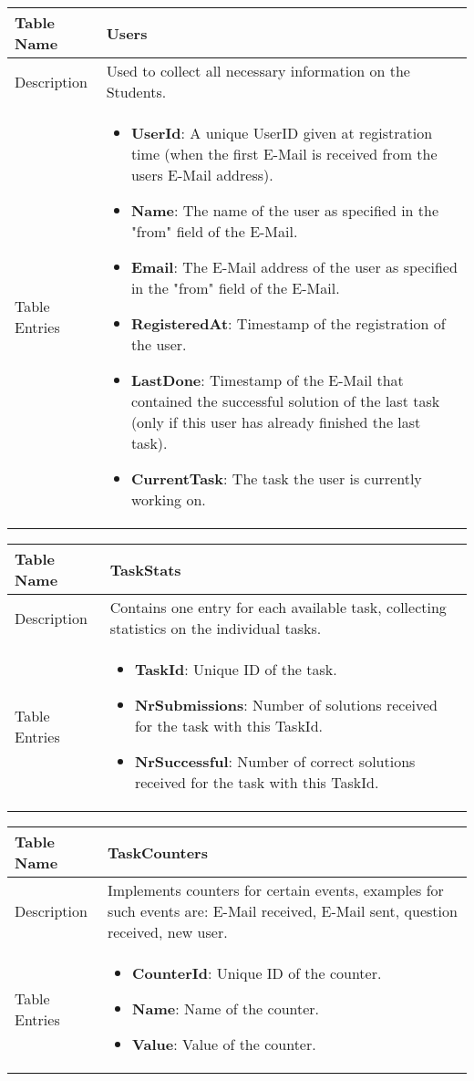 \begin{tabular}{|p{3cm}|p{10cm}|}
\hline
Table Name & Users \\
\hline
Description & Used to collect all necessary information on the Students.\\
\hline
Table Entries & \begin{itemize}
        \item {\bf UserId}: A unique UserID given at registration time (when the first E-Mail
            is received from the users E-Mail address).
        \item {\bf Name}: The name of the user as specified in the "from" field of the E-Mail.
        \item {\bf Email}: The E-Mail address of the user as specified in the "from" field of the
            E-Mail.
        \item {\bf RegisteredAt}: Timestamp of the registration of the user.
        \item {\bf LastDone}: Timestamp of the E-Mail that contained the successful solution of the
            last task (only if this user has already finished the last task).
        \item {\bf CurrentTask}: The task the user is currently working on.
        \end{itemize} \\
\hline
\end{tabular}

\begin{tabular}{|p{3cm}|p{10cm}|}
\hline
Table Name & TaskStats \\
\hline
Description & Contains one entry for each available task, collecting statistics on the individual tasks.\\
\hline
Table Entries & \begin{itemize}
        \item {\bf TaskId}: Unique ID of the task.
        \item {\bf NrSubmissions}: Number of solutions received for the task with this TaskId.
        \item {\bf NrSuccessful}: Number of correct solutions received for the task with this TaskId.
        \end{itemize} \\
\hline
\end{tabular}

\begin{tabular}{|p{3cm}|p{10cm}|}
\hline
Table Name & TaskCounters \\
\hline
Description & Implements counters for certain events, examples for such events are: E-Mail received, E-Mail sent,
question received, new user.\\
\hline
Table Entries & \begin{itemize}
        \item {\bf CounterId}: Unique ID of the counter.
        \item {\bf Name}: Name of the counter.
        \item {\bf Value}: Value of the counter.
        \end{itemize} \\
\hline
\end{tabular}

